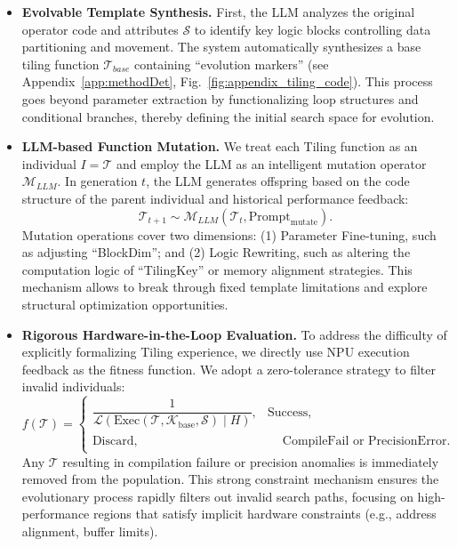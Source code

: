\documentclass{article}
\theoremstyle{plain}
\theoremstyle{definition}
\theoremstyle{remark}
\begin{document}
\begin{itemize}
\item \textbf{Evolvable Template Synthesis.}
First, the LLM analyzes the original operator code and attributes $\mathcal{S}$ to identify key logic blocks controlling data partitioning and movement. The system automatically synthesizes a base tiling function $\mathcal{T}_{base}$ containing ``evolution markers'' (see Appendix~\ref{app:methodDet}, Fig.~\ref{fig:appendix_tiling_code}). This process goes beyond parameter extraction by functionalizing loop structures and conditional branches, thereby defining the initial search space for evolution.

\item \textbf{LLM-based Function Mutation.}
We treat each Tiling function as an individual $I = \mathcal{T}$ and employ the LLM as an intelligent mutation operator $\mathcal{M}_{LLM}$. In generation $t$, the LLM generates offspring based on the code structure of the parent individual and historical performance feedback:
\begin{equation}
    \mathcal{T}_{t+1} \sim \mathcal{M}_{LLM}(\mathcal{T}_t, \text{Prompt}_{\text{mutate}}).
\end{equation}
Mutation operations cover two dimensions: 
(1) Parameter Fine-tuning, such as adjusting ``BlockDim''; and 
(2) Logic Rewriting, such as altering the computation logic of ``TilingKey'' or memory alignment strategies. 
This mechanism allows to break through fixed template limitations and explore structural optimization opportunities.

\item \textbf{Rigorous Hardware-in-the-Loop Evaluation.}
To address the difficulty of explicitly formalizing Tiling experience, we directly use NPU execution feedback as the fitness function. We adopt a zero-tolerance strategy to filter invalid individuals:
\begin{equation}
\label{eq:fitness}
f(\mathcal{T})=
\begin{cases}
\dfrac{1}{\mathcal{L}\!\left(\mathrm{Exec}\!\left(\mathcal{T},\mathcal{K}_{\text{base}},\mathcal{S}\right) \mid H\right)},
& \text{Success},\\[15pt] %
\text{Discard},
& \begin{aligned}
& \text{CompileFail or PrecisionError}.
\end{aligned}
\end{cases}
\end{equation}
Any $\mathcal{T}$ resulting in compilation failure or precision anomalies is immediately removed from the population. This strong constraint mechanism ensures the evolutionary process rapidly filters out invalid search paths, focusing on high-performance regions that satisfy implicit hardware constraints (e.g., address alignment, buffer limits).
\end{itemize}
\end{document}
